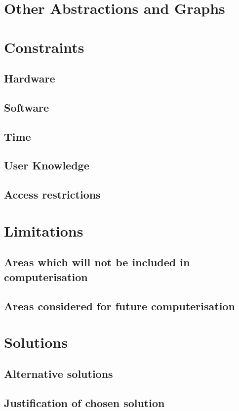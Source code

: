 \section{Other Abstractions and Graphs}

\section{Constraints}

\subsection{Hardware}

\subsection{Software}

\subsection{Time}

\subsection{User Knowledge}

\subsection{Access restrictions}

\section{Limitations}

\subsection{Areas which will not be included in computerisation}

\subsection{Areas considered for future computerisation}

\section{Solutions}

\subsection{Alternative solutions}

\subsection{Justification of chosen solution}
